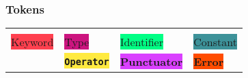 \documentclass[tikz, xcolor=table]{beamer}
\begin{document}
\begin{frame} \frametitle{Tokens}
\small \begin{table}[] \centering \begin{tabular}{llll}\multicolumn{4}{c}{\cellcolor[HTML]{680100}{\color[HTML]{00FF3A} {\normalsize \sc \textbf{Tokens}}}}\\\color{blue}\colorbox[HTML]{FF404F}{Keyword}&\color{white}\colorbox[HTML]{CC147F}{Type}&\color{violet}\colorbox[HTML]{00FF85}{Identifier}&\color{white}\colorbox[HTML]{3D9299}{Constant}\\\color{black}{StringLiteral}&\color{black}\bf\colorbox[HTML]{FFEA40}{\tt Operator}&\color{blue}\bf\colorbox[HTML]{DA40FF}{Punctuator}&\color[HTML]{19FFDF}\bf\colorbox[HTML]{FF4C00}{Error}\end{tabular}\end{table}\end{frame}
\end{document}
